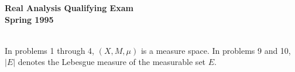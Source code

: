 \documentclass{article}
\begin{document}






\begin{center}\begin{LARGE}
{\bf Real Analysis Qualifying Exam}\\ 
{\bf Spring 1995}\\ \end{LARGE}
\end{center}
\vspace{0.1in}
\noindent\hrulefill\\

In problems 1 through 4, $(X, M, \mu)$ is a measure space. In problems 9
and 10, $|E|$ denotes the Lebesgue measure of the measurable set $E$.
\end{document}
